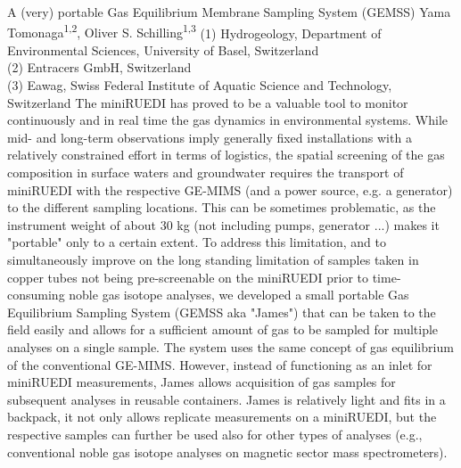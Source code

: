 \begin{conf-abstract}
{A (very) portable Gas Equilibrium Membrane Sampling System (GEMSS)}
{Yama Tomonaga\textsuperscript{1,2}, Oliver S. Schilling\textsuperscript{1,3}}
{(1) Hydrogeology, Department of Environmental Sciences, University of Basel, Switzerland\\
(2) Entracers GmbH, Switzerland\\
(3) Eawag, Swiss Federal Institute of Aquatic Science and Technology, Switzerland}
{The miniRUEDI has proved to be a valuable tool to monitor continuously and in real time the gas dynamics in environmental systems. While mid- and long-term observations imply generally fixed installations with a relatively constrained effort in terms of logistics, the spatial screening of the gas composition in surface waters and groundwater requires the transport of miniRUEDI with the respective GE-MIMS (and a power source, e.g. a generator) to the different sampling locations. This can be sometimes problematic, as the instrument weight of about 30 kg (not including pumps, generator ...) makes it "portable" only to a certain extent. To address this limitation, and to simultaneously improve on the long standing limitation of samples taken in copper tubes not being pre-screenable on the miniRUEDI prior to time-consuming noble gas isotope analyses, we developed a small portable Gas Equilibrium Sampling System (GEMSS aka "James") that can be taken to the field easily and allows for a sufficient amount of gas to be sampled for multiple analyses on a single sample. The system uses the same concept of gas equilibrium of the conventional GE-MIMS. However, instead of functioning as an inlet for miniRUEDI measurements, James allows acquisition of gas samples for subsequent analyses in reusable containers. James is relatively light and fits in a backpack, it not only allows replicate measurements on a miniRUEDI, but the respective samples can further be used also for other types of analyses (e.g., conventional noble gas isotope analyses on magnetic sector mass spectrometers).}
\end{conf-abstract}
